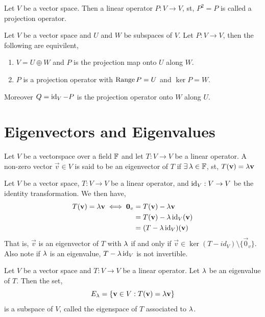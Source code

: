 \documentclass{article}
\begin{document}
\begin{ndefi}
  Let $V$ be a vector space. Then a linear operator $P : V \to V$, st, $P^2 = P$ is called a projection operator.
\end{ndefi}

\begin{nthm}
  Let $V$ be a vector space and $U$ and $W$ be subspaces of $V$. Let $P : V \to V$, then the following are equivilent,
  \begin{enumerate}
    \item $V = U \oplus W$ and $P$ is the projection map onto $U$ along $W$.
    \item $P$ is a projection operator with $\operatorname{Range} P = U$ and $\ker P = W$.
  \end{enumerate}
  Moreover $Q = \operatorname{id}_V - P$ is the projection operator onto $W$ along $U$.
\end{nthm}

\section{Eigenvectors and Eigenvalues}

\begin{ndefi}
  Let $V$ be a vectorspace over a field $\mathbb{F}$ and let $T : V \to V$ be a linear operator. A non-zero vector $\vec v \in V$ is said to be an eigenvector of $T$ if $\exists\, \lambda \in \mathbb{F}$, st, $T(\boldsymbol{\mathbf{v}})= \lambda \boldsymbol{\mathbf{v}}$
\end{ndefi}

\begin{remark}
  Let $V$ be a vector space, $T : V \to V$ be a linear operator, and $\operatorname{id}_V : V \to V$ be the identity transformation. We then have,
  \begin{align*}
    T(\boldsymbol{\mathbf{v}}) = \lambda \boldsymbol{\mathbf{v}} \iff \boldsymbol{\mathbf{0}}_v &= T(\boldsymbol{\mathbf{v}}) - \lambda \boldsymbol{\mathbf{v}}\\
    &= T(\boldsymbol{\mathbf{v}}) - \lambda \operatorname{id}_V(\boldsymbol{\mathbf{v}})\\
    &= (T - \lambda \operatorname{id}_V)(\boldsymbol{\mathbf{v}})
  \end{align*}
  That is, $\vec v$ is an eigenvector of $T$ with $\lambda$ if and only if $\vec v\in \ker (T - id_V)\setminus\{\vec 0_v\}$. Also note if $\lambda$ is an eigenvalue, $T - \lambda\operatorname{id}_V$ is not invertible.
\end{remark}

\begin{ncor}
  Let $V$ be a vector space and $T : V \to V$ be a linear operator. Let $\lambda$ be an eigenvalue of $T$. Then the set,
  $$ E_\lambda = \{\boldsymbol{\mathbf{v}} \in V : T(\boldsymbol{\mathbf{v}}) = \lambda \boldsymbol{\mathbf{v}}\} $$
  is a subspace of $V$, called the eigenspace of $T$ associated to $\lambda$.
\end{ncor}
\end{document}
